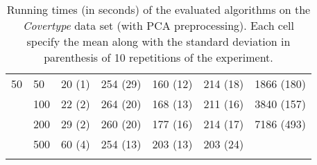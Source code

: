 \begin{longtable}{llrrrrr}
 \midrule
50 & 50  &  20 (1) &       254 (29) &  160 (12) &             214 (18) &  1866 (180) \\
   & 100 &  22 (2) &       264 (20) &  168 (13) &             211 (16) &  3840 (157) \\
   & 200 &  29 (2) &       260 (20) &  177 (16) &             214 (17) &  7186 (493) \\
   & 500 &  60 (4) &       254 (13) &  203 (13) &             203 (24) &          \\
\bottomrule
\caption{Running times (in seconds) of the evaluated algorithms on the \textit{Covertype} data set (with PCA preprocessing). Each cell specify the mean along with the standard deviation in parenthesis of 10 repetitions of the experiment.}
\label{tab:running-time-mean-covertype-pca}
\end{longtable}

